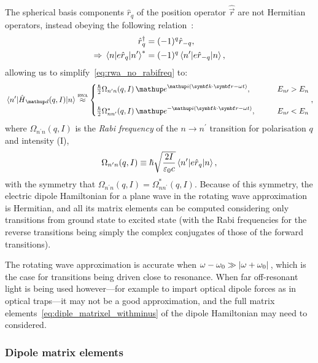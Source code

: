 The spherical basis components $\hat r_q$ of the position operator $\hat{\vec r}$ are not Hermitian operators, instead obeying the following relation~\cite{steck_quantum_2017}:
\begin{align}
\hat r_q^\dagger &= (-1)^q \hat r_{-q},\\
\Rightarrow \matrixel{n} {e\hat r_q}{n^\prime}^* &= (-1)^q\matrixel{n^\prime} {e\hat r_{-q}}{n},
\end{align}
allowing us to simplify~\eqref{eq:rwa_no_rabifreq} to:
\begin{align}\label{eq:rwa_with_rabifreq}
\matrixel{n^\prime}{\hat H_\up{d}(q,I)}{n} \overset{\textsc{rwa}}\approx
\begin{cases}
\frac\hbar2\Omega_{n^\prime n}(q, I)\,
\ee^{\ii(\vec k \cdot \vec r - \omega t)},\qquad &E_{n\prime} > E_n\\
\\
\frac\hbar2\Omega^*_{n n^\prime}(q, I)\,
\ee^{-\ii(\vec k \cdot \vec r - \omega t)},\qquad &E_{n\prime} < E_n
\end{cases},
\end{align}
where $\Omega_{n^\prime n}(q, I)$ is the \emph{Rabi frequency} of the $n\rightarrow n^\prime$ transition for polarisation $q$ and intensity (I),
\begin{align}
\Omega_{n^\prime n}(q, I) \equiv \hbar\sqrt{\frac{2I}{\varepsilon_0 c}}
\matrixel{n^\prime}{e\hat r_q}{n},
\end{align}
with the symmetry that $\Omega_{n^\prime n}(q, I) = \Omega^*_{n n^\prime}(q, I)$. Because of this symmetry, the electric dipole Hamiltonian for a plane wave in the rotating wave approximation is Hermitian, and all its matrix elements can be computed considering only transitions from ground state to excited state (with the Rabi frequencies for the reverse transitions being simply the complex conjugates of those of the forward transitions).

The rotating wave approximation is accurate when $\omega - \omega_0 \gg \abs{\omega + \omega_0}$, which is the case for transitions being driven close to resonance. When far off-resonant light is being used however---for example to impart optical dipole forces as in optical traps---it may not be a good approximation, and the full matrix elements~\eqref{eq:diple_matrixel_withminus} of the dipole Hamiltonian may need to considered.

\subsubsection{Dipole matrix elements}

